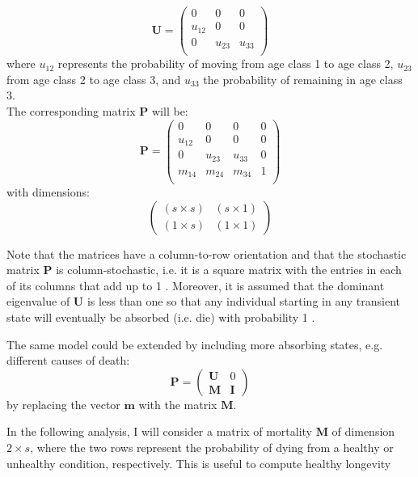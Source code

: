 \documentclass[\main/main.tex]{subfiles}
\begin{document}
\begin{equation}
    \mathbf{U}= \begin{pmatrix}
    0 & 0 & 0\\
    u_{12} & 0 & 0\\
0 & u_{23} & u_{33}\\
    \end{pmatrix}
\end{equation}
where $ u_{12}$ represents the probability of moving from age class 1 to age class 2, $ u_{23}$ from age class 2 to age class 3, and $ u_{33}$ the probability of remaining in age class 3.\\

\noindent The corresponding matrix $\mathbf{P}$ will be:
\begin{equation}
    \mathbf{P}= \begin{pmatrix}
    0 & 0 & 0 & 0\\
    u_{12} & 0 & 0& 0\\
0 & u_{23} & u_{33}& 0\\
m_{14} & m_{24} & m_{34}& 1\\
    \end{pmatrix}
\end{equation}
with dimensions:
\begin{equation}
\begin{pmatrix}
    (s \times s) &  (s \times 1)\\
    (1 \times s) & (1 \times 1)
\end{pmatrix}
\end{equation}

\noindent Note that the matrices have a column-to-row orientation and that the stochastic matrix $\mathbf{P}$ is column-stochastic, i.e. it is a square matrix with the entries in each of its columns that add up to 1 \citep{Poole1995}. Moreover, it is assumed that the dominant eigenvalue of $\mathbf{U}$ is less than one so that any individual starting in any transient state will eventually be absorbed (i.e. die) with probability 1 \citep{Caswell2011}.

The same model could be extended by including more absorbing states, e.g. different causes of death:
\begin{equation}\label{matrixmodel}
    \mathbf{P} = \begin{pmatrix}
        \mathbf{U} &  0\\
    \mathbf{M}& \mathbf{I}
    \end{pmatrix}
\end{equation}
by replacing the vector $\mathbf{m}$ with the matrix $\mathbf{M}$.

\noindent
In the following analysis, I will consider a matrix of mortality $\mathbf{M}$ of dimension $2 \times s$, where the two rows represent the probability of dying from a healthy or unhealthy condition, respectively. This is useful to compute healthy longevity \citep{Caswell2018a}
\end{document}

